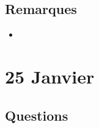 \documentclass[a4paper, 11pt, hidelinks]{article}
\begin{document}
\subsection{Remarques}



\begin{itemize}
    \item 
\end{itemize}






\section{25 Janvier}


\subsection{Questions}
\end{document}
